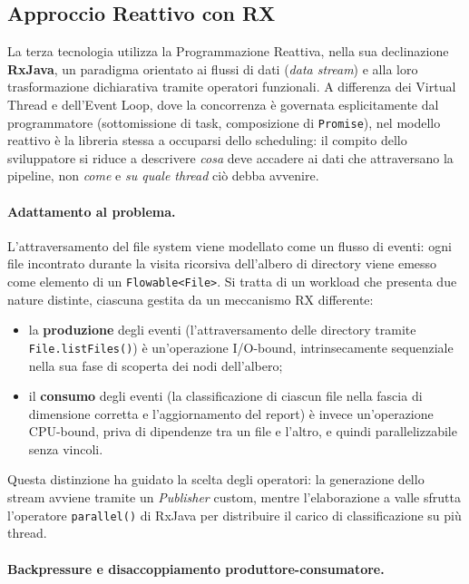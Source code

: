 \documentclass[11pt,a4paper]{article}
\begin{document}
\subsection{Approccio Reattivo con RX}
La terza tecnologia utilizza la Programmazione Reattiva, nella sua declinazione \textbf{RxJava}, un paradigma orientato ai flussi di dati (\textit{data stream}) e alla loro trasformazione dichiarativa tramite operatori funzionali. A differenza dei Virtual Thread e dell'Event Loop, dove la concorrenza è governata esplicitamente dal programmatore (sottomissione di task, composizione di \texttt{Promise}), nel modello reattivo è la libreria stessa a occuparsi dello scheduling: il compito dello sviluppatore si riduce a descrivere \textit{cosa} deve accadere ai dati che attraversano la pipeline, non \textit{come} e \textit{su quale thread} ciò debba avvenire.

\paragraph{Adattamento al problema.}

L'attraversamento del file system viene modellato come un flusso di eventi: ogni file incontrato durante la visita ricorsiva dell'albero di directory viene emesso come elemento di un \texttt{Flowable<File>}. Si tratta di un workload che presenta due nature distinte, ciascuna gestita da un meccanismo RX differente:

\begin{itemize}
    \item la \textbf{produzione} degli eventi (l'attraversamento delle directory tramite \texttt{File.listFiles()}) è un'operazione I/O-bound, intrinsecamente sequenziale nella sua fase di scoperta dei nodi dell'albero;
    \item il \textbf{consumo} degli eventi (la classificazione di ciascun file nella fascia di dimensione corretta e l'aggiornamento del report) è invece un'operazione CPU-bound, priva di dipendenze tra un file e l'altro, e quindi parallelizzabile senza vincoli.
\end{itemize}

Questa distinzione ha guidato la scelta degli operatori: la generazione dello stream avviene tramite un \textit{Publisher} custom, mentre l'elaborazione a valle sfrutta l'operatore \texttt{parallel()} di RxJava per distribuire il carico di classificazione su più thread.

\paragraph{Backpressure e disaccoppiamento produttore-consumatore.}
\end{document}
